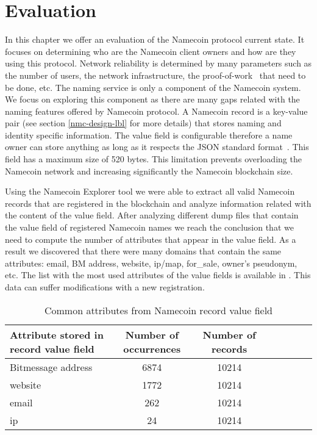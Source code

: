 \chapter{Evaluation}
\label{chapter:6}
In this chapter we offer an evaluation of the Namecoin protocol current state. It focuses on determining who are the Namecoin client owners and how are they using this protocol. Network reliability is determined by many parameters such as the number of users, the network infrastructure, the proof-of-work~\cite{proofofwork} that need to be done, etc.
The naming service is only a component of the Namecoin system. We focus on exploring this component as there are many gaps related with the naming features offered by Namecoin protocol. A Namecoin record is a key-value pair (see section \ref{nmc-design-lbl} for more details) that stores naming and identity specific information. The value field is configurable therefore a name owner can store anything as long as it respects the JSON standard format~\cite{rfc7159}. This field has a maximum size of 520 bytes. This limitation prevents overloading the Namecoin network and increasing significantly the Namecoin blockchain size.

Using the Namecoin Explorer tool we were able to extract all valid Namecoin records that are registered in the blockchain and analyze information related with the content of the value field. After analyzing different dump files that contain the value field of registered Namecoin names we reach the conclusion that we need to compute the number of attributes that appear in the value field.
As a result we discovered that there were many domains that contain the same attributes: email, BM address, website, ip/map, for_sale, owner's pseudonym, etc.
The list with the most used attributes of the value fields is available in . This data can suffer modifications with a new registration.

\begin{center}
	\begin{table}[htb]
		\centering
		\caption{Common attributes from Namecoin record value field}
		\begin{tabular}{l*{6}{c}r}
			Attribute stored in record value field & Number of occurrences & Number of records\\
			\hline
			Bitmessage address & 6874 & 10214\\
			website & 1772 & 10214\\
			email & 262 & 10214\\
			ip & 24 & 10214
		\end{tabular}
		\label{table:count-att-table}
	\end{table}
\end{center}
 
